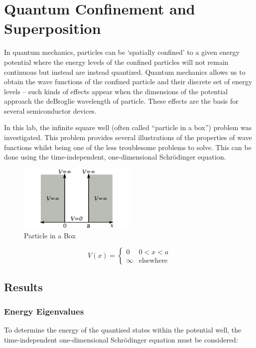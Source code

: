 \renewcommand{\chaptername}{Feb 8th: Lab}
\chapter{Quantum Confinement and Superposition}
In quantum mechanics, particles can be `spatially confined' to a given energy potential where the energy levels of the confined particles will not remain continuous but instead are instead quantized.
Quantum mechanics allows us to obtain the wave functions of the confined particle and their discrete set of energy levels -- such kinds of effects appear when the dimensions of the potential approach the deBroglie wavelength of particle. These effects are the basis for several semiconductor devices.

In this lab, the infinite square well (often called ``particle in a box'') problem was investigated. This problem provides several illustrations of the properties of wave functions whilst being one of the less troublesome problems to solve. This can be done using the time-independent, one-dimensional Schrödinger equation.

\begin{figure}[h]
    \centering
    \includegraphics[width=0.5\textwidth]{lab1/images/pIAB.png}
    \caption{Particle in a Box}
    \label{fig:particleInABox}
\end{figure}

\[
  V(x) = \begin{cases}
  0 & 0 < x < a\\
  \infty & \text{elsewhere}
\end{cases}
\]
   
\section{Results}
\subsection{Energy Eigenvalues}
To determine the energy of the quantised states within the potential well, the time-independent one-dimensional Schrödinger equation must be considered:

